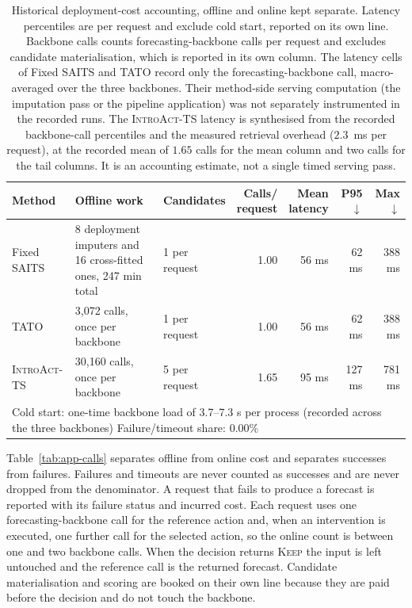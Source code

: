 \documentclass{article}
\newcommand{\introact}{\textsc{IntroAct-TS}}
\begin{document}
\begin{table}[t]
  \caption{Historical deployment-cost accounting, offline and online kept
  separate. Latency percentiles are per request and exclude cold start, reported on its own
  line. Backbone calls counts forecasting-backbone calls per request and excludes candidate
  materialisation, which is reported in its own column. The latency cells of Fixed SAITS and
  TATO record only the forecasting-backbone call, macro-averaged over the three backbones. Their method-side serving computation (the imputation pass or the pipeline application) was
  not separately instrumented in the recorded runs. The \introact{} latency is synthesised
  from the recorded backbone-call percentiles and the measured retrieval overhead
  ($2.3$~ms per request), at the recorded mean of $1.65$ calls for the mean column and two
  calls for the tail columns. It is an accounting estimate, not a single timed serving pass.}
  \label{tab:app-efficiency}
  \centering
  \small
  \setlength{\tabcolsep}{4pt}
\begin{tabularx}{\textwidth}{@{}lXXrrrr@{}}
    \toprule
    Method & Offline work & Candidates & \shortstack[r]{Calls/\\request} & \shortstack[r]{Mean\\latency} & P95 $\downarrow$ & Max $\downarrow$ \\
    \midrule
    Fixed SAITS           & 8 deployment imputers and 16 cross-fitted ones, 247 min total     & 1 per request     & 1.00     & 56 ms     & 62 ms     & 388 ms \\
    TATO               & 3,072 calls, once per backbone   & 1 per request   & 1.00   & 56 ms   & 62 ms   & 388 ms \\
    \rowcolor{bestgray}\introact{} & 30,160 calls, once per backbone & 5 per request & 1.65 & 95 ms & 127 ms & 781 ms \\
    \midrule
    \multicolumn{7}{p{0.97\textwidth}}{\footnotesize Cold start: one-time backbone load of 3.7--7.3 s per process (recorded across the three backbones) \quad
    Failure/timeout share: 0.00\%} \\
    \bottomrule
  \end{tabularx}
\end{table}

Table~\ref{tab:app-calls} separates offline from online cost and separates successes from
failures. Failures and timeouts are never counted as successes and are never dropped from the
denominator. A request that fails to produce a forecast is reported with its failure status and incurred cost. Each request uses one forecasting-backbone call for the reference action
and, when an intervention is executed, one further call for the selected action, so the online
count is between one and two backbone calls. When the decision returns \textsc{Keep} the input
is left untouched and the reference call is the returned forecast. Candidate materialisation
and scoring are booked on their own line because they are paid before the decision and do not
touch the backbone.
\end{document}
